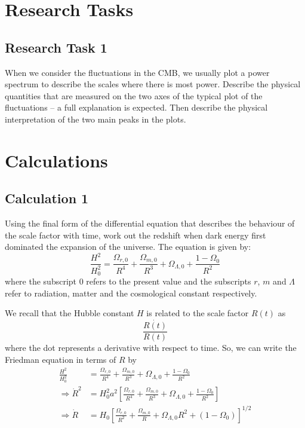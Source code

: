 \documentclass[a4paper]{article} %
\begin{document}
\section{Research Tasks}
\subsection{Research Task 1}
\begin{framed}
When we consider the fluctuations in the CMB, we usually plot a power spectrum to describe the scales where there is most power. Describe the physical quantities that are measured on the two axes of the typical plot of the fluctuations – a full explanation is expected. Then describe the physical interpretation of the two main peaks in the plots.
\end{framed}



\section{Calculations}

\subsection{Calculation 1}
\begin{framed}
Using the final form of the differential equation that describes the behaviour of the scale factor with time, work out the redshift when dark energy first dominated the expansion of the universe. The equation is given by:
\begin{equation*}
\frac{H^2}{H_0^2}=\frac{\Omega_{r,0}}{R^4}+\frac{\Omega_{m,0}}{R^3}
+\Omega_{\Lambda,0}+\frac{1-\Omega_{0}}{R^2}
\end{equation*}
where the subscript $0$ refers to the present
value and the subscripts $r$, $m$ and $\Lambda$ refer to radiation, matter and the cosmological constant respectively.
\end{framed}

We recall that the Hubble constant $H$ is related to the scale factor $R(t)$ as
\begin{equation}
\frac{\dot{R(t)}}{R(t)}
\end{equation}
where the dot represents a derivative with respect to time. So, we can write the Friedman equation in terms of $R$ by
\begin{align}
\frac{H^2}{H_0^2}&=\frac{\Omega_{r,0}}{R^4}+\frac{\Omega_{m,0}}{R^3}
+\Omega_{\Lambda,0}+\frac{1-\Omega_{0}}{R^2}\\
\Rightarrow \dot{R}^2&=H_0^2 a^2 \left[\frac{\Omega_{r,0}}{R^4}+\frac{\Omega_{m,0}}{R^3}
+\Omega_{\Lambda,0}+\frac{1-\Omega_{0}}{R^2}\right]\\
\Rightarrow \dot{R}&= H_0\left[\frac{\Omega_{r,0}}{R^2}+\frac{\Omega_{m,0}}{R}+\Omega_{\Lambda,0}R^2 + (1-\Omega_0)\right]^{1/2}\label{dot a}
\end{align}
\end{document}
